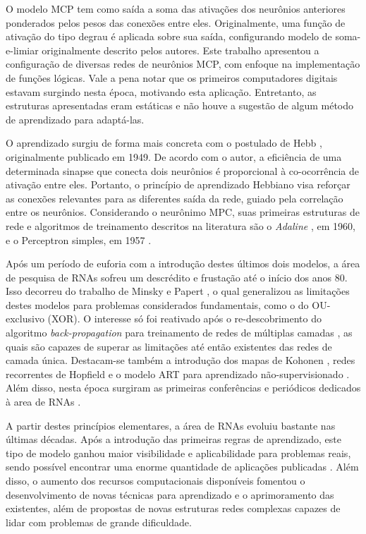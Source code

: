 \documentclass[conference]{IEEEtran}
\begin{document}
	O modelo MCP tem como saída a soma das ativações dos neurônios anteriores ponderados pelos pesos das conexões entre eles. Originalmente, uma função de ativação do tipo degrau é aplicada sobre sua saída, configurando modelo de soma-e-limiar originalmente descrito pelos autores. Este trabalho apresentou a configuração de diversas redes de neurônios MCP, com enfoque na implementação de funções lógicas. Vale a pena notar que os primeiros computadores digitais estavam surgindo nesta época, motivando esta aplicação. Entretanto, as estruturas apresentadas eram estáticas e não houve a sugestão de algum método de aprendizado para adaptá-las.
	
	O aprendizado surgiu de forma mais concreta com o postulado de Hebb \cite{hebb2005organization}, originalmente publicado em 1949. De acordo com o autor, a eficiência de uma determinada sinapse que conecta dois neurônios é proporcional à co-ocorrência de ativação entre eles. Portanto, o princípio de aprendizado Hebbiano visa reforçar as conexões relevantes para as diferentes saída da rede, guiado pela correlação entre os neurônios. Considerando o neurônimo MPC, suas primeiras estruturas de rede e algoritmos de treinamento descritos na literatura são o \textit{Adaline} \cite{widrow1960adaptive}, em 1960, e o Perceptron simples, em 1957 \cite{rosenblatt1957perceptron}.
	
	Após um período de euforia com a introdução destes últimos dois modelos, a área de pesquisa de RNAs sofreu um descrédito e frustação até o início dos anos 80. Isso decorreu  do trabalho de Minsky e Papert \cite{minsky1969introduction}, o qual generalizou as limitações destes modelos para problemas considerados fundamentais, como o do OU-exclusivo (XOR). O interesse só foi reativado após o re-descobrimento do algoritmo \textit{back-propagation} para treinamento de redes de múltiplas camadas \cite{rumelhart1985learning}, as quais são capazes de superar as limitações até então existentes das redes de camada única. Destacam-se também a introdução dos mapas de Kohonen \cite{kohonen1982self}, redes recorrentes de Hopfield \cite{hopfield1982neural} e o modelo ART para aprendizado não-supervisionado \cite{carpenter1987massively}. Além disso, nesta época surgiram as primeiras conferências e periódicos dedicados à area de RNAs \cite{macukow2016neural}.
	
	A partir destes princípios elementares, a área de RNAs evoluiu bastante nas últimas décadas. Após a introdução das primeiras regras de aprendizado, este tipo de modelo ganhou maior visibilidade e aplicabilidade para problemas reais, sendo possível encontrar uma enorme quantidade de aplicações publicadas \cite{abiodun2018state}. Além disso, o aumento dos recursos computacionais disponíveis fomentou o desenvolvimento de novas técnicas para aprendizado e o aprimoramento das existentes, além de propostas de novas estruturas redes complexas capazes de lidar com problemas de grande dificuldade.
	
\end{document}
